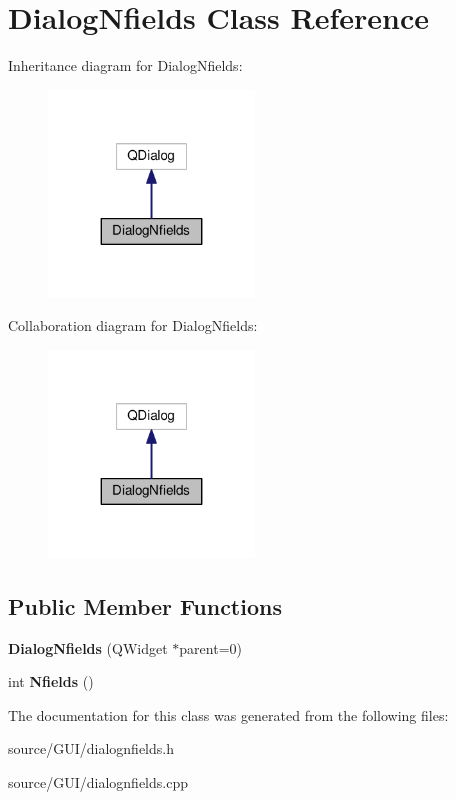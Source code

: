\section{Dialog\+Nfields Class Reference}
\label{class_dialog_nfields}


Inheritance diagram for Dialog\+Nfields\+:\nopagebreak
\begin{figure}[H]
\begin{center}
\leavevmode
\includegraphics[width=155pt]{class_dialog_nfields__inherit__graph}
\end{center}
\end{figure}


Collaboration diagram for Dialog\+Nfields\+:\nopagebreak
\begin{figure}[H]
\begin{center}
\leavevmode
\includegraphics[width=155pt]{class_dialog_nfields__coll__graph}
\end{center}
\end{figure}
\subsection*{Public Member Functions}
\begin{DoxyCompactItemize}
\item 
{\bfseries Dialog\+Nfields} (Q\+Widget $\ast$parent=0)\label{class_dialog_nfields_ac8ff0a03066a6fb25c62240bdf92bf6b}

\item 
int {\bfseries Nfields} ()\label{class_dialog_nfields_a6e0eb6eb0a2e5f5db90e49f96dd0d14e}

\end{DoxyCompactItemize}


The documentation for this class was generated from the following files\+:\begin{DoxyCompactItemize}
\item 
source/\+G\+U\+I/dialognfields.\+h\item 
source/\+G\+U\+I/dialognfields.\+cpp\end{DoxyCompactItemize}
